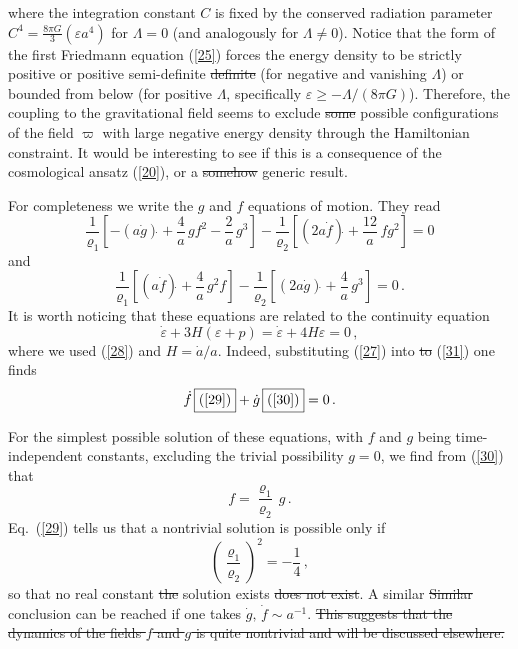 \documentclass[11pt, a4paper]{article}
\newcommand{\lang}[1]{\textcolor{langfix}{#1}}
\newcommand{\subst}[1]{\textcolor{substantive}{#1}}
\newcommand{\rem}[1]{\textcolor{removeprop}{\sout{#1}}}
\begin{document}
\subst{where the integration constant $C$ is fixed by the conserved radiation parameter $C^4 = \frac{8\pi G}{3} (\varepsilon a^4)$ for $\Lambda = 0$ (and analogously for $\Lambda \neq 0$).} Notice that the form of the first Friedmann equation (\ref{25}) forces the energy density to be strictly positive or positive \lang{semi-definite} \rem{definite} (for negative and vanishing $\Lambda$) or bounded from below (for positive $\Lambda$, \subst{specifically $\varepsilon \ge -\Lambda / (8\pi G)$}). Therefore, the coupling to the gravitational field seems to exclude \rem{some} possible configurations of the field $\varpi$ with large negative energy density \subst{through the Hamiltonian constraint}. It would be interesting to see if this is a consequence of the cosmological ansatz (\ref{20}), or a \rem{somehow} generic result.

For completeness we write the $g$ and $f$ equations of motion. They read
\begin{equation}
\frac{1}{\varrho_1}\left[ -(a\dot g)\dot{} + \frac{4}{a}\, gf^2 - \frac{2}{a}\, g^3\right] -\frac{1}{\varrho_2}\left[ (2a\dot f)\dot{} + \frac{12}{a}\, fg^2 \right]=0\label{29}
\end{equation}
and
\begin{equation}
\frac{1}{\varrho_1}\left[ (a\dot f)\dot{} + \frac{4}{a}\, g^2f \right] -\frac{1}{\varrho_2}\left[ (2a\dot g)\dot{} + \frac{4}{a}\, g^3 \right]=0\,.\label{30}
\end{equation}
It is worth noticing that these equations are related to the continuity equation
\begin{equation}\label{31}
\dot \varepsilon +3H(\varepsilon+p)= \dot \varepsilon +4H\varepsilon=0\,,
\end{equation}
where we used (\ref{28}) \subst{and $H = \dot{a}/a$}. Indeed, substituting (\ref{27}) \lang{into} \rem{to} (\ref{31}) one finds
\begin{equation}\label{32}
\dot f\, \mbox{\framebox{(\ref{29})}} +\dot g\, \mbox{\framebox{(\ref{30})}}=0\,.
\end{equation}

For the simplest possible solution of these equations, with $f$ and $g$ being time-independent constants, excluding the trivial possibility $g=0$, we find from (\ref{30}) that
\begin{equation}
f=\frac{\varrho_1}{\varrho_2}\,g\,.
\end{equation}
Eq.\ (\ref{29}) tells \lang{us} that a nontrivial solution is possible only if
\begin{equation}
\left(\frac{\varrho_1}{\varrho_2}\right)^2=-\frac{1}{4}\,,
\end{equation}
so that \lang{no real constant} \rem{the} solution \lang{exists} \rem{does not exist}. \lang{A similar} \rem{Similar} conclusion can be reached if one takes $\dot g,\, \dot f \sim a^{-1}$. \rem{This suggests that the dynamics of the fields $f$ and $g$ is quite nontrivial and will be discussed elsewhere.}
\end{document}
